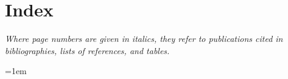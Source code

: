 
\clearpage
\section*{Index}

\begin{center}
\emph{Where page numbers are given in italics, they refer to publications
cited in bibliographies, lists of references, and tables.}
\end{center}

\begingroup
\small
\setlength{\columnsep}{2.2em}
\setlength{\parindent}{0pt}
\setlength{\parskip}{0pt}
\emergencystretch=1em
\raggedright
\raggedcolumns

\newcommand{\idxbib}[1]{\textit{#1}}
\newcommand{\idxentry}[1]{%
  \par\noindent\hangindent=1.75em\hangafter=1 #1\par
}
\newcommand{\idxsubentry}[1]{%
  \par\noindent\hspace*{1.25em}%
  \hangindent=3em\hangafter=1 #1\par
}
\newcommand{\idxgroup}{\par\addvspace{0.65\baselineskip}}

